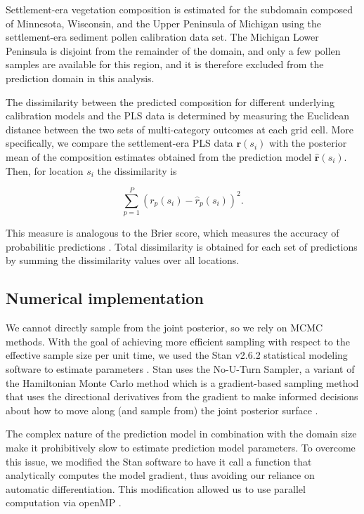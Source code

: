 \documentclass[12pt]{article}
\begin{document}
Settlement-era vegetation composition is estimated for the subdomain
composed of Minnesota, Wisconsin, and the Upper Peninsula of Michigan
using the settlement-era sediment pollen calibration data set. The
Michigan Lower Peninsula is disjoint from the remainder of the domain,
and only a few pollen samples are available for this region, and it is
therefore excluded from the prediction domain in this analysis.

The dissimilarity between the predicted composition for different
underlying calibration models and the PLS data is determined by
measuring the Euclidean distance between the two sets of
multi-category outcomes at each grid cell. More specifically, we
compare the settlement-era PLS data $\bm{r}(s_i)$ with the posterior
mean of the composition estimates obtained from the prediction model
$\hat{\bm{r}}(s_i)$. Then, for location $s_i$ the dissimilarity is
\begin{linenomath*}
\begin{equation*}
\sum_{p=1}^{P} (r_p(s_i) - \hat{r}_p(s_i))^2.
\end{equation*}
\end{linenomath*}
This measure is analogous to the Brier score, which measures the
accuracy of probabilitic predictions
\citep{gneiting2007strictly}. Total dissimilarity is obtained for each
set of predictions by summing the dissimilarity values over all
locations.

\subsection{Numerical implementation}
\label{sec:imp}

We cannot directly sample from the joint posterior, so we rely on MCMC
methods. With the goal of achieving more efficient sampling with
respect to the effective sample size per unit time, we used the Stan
v2.6.2 statistical modeling software to estimate parameters
\citep{stan-software:2014}. Stan uses the No-U-Turn Sampler, a variant
of the Hamiltonian Monte Carlo method which is a gradient-based
sampling method that uses the directional derivatives from the
gradient to make informed decisions about how to move along (and
sample from) the joint posterior surface \citep{hoffman2011nuts}.

The complex nature of the prediction model in combination with the
domain size make it prohibitively slow to estimate prediction model
parameters. To overcome this issue, we modified the Stan software to
have it call a function that analytically computes the model gradient,
thus avoiding our reliance on automatic differentiation. This
modification allowed us to use parallel computation via openMP
\citep{openmp08}.
\end{document}
